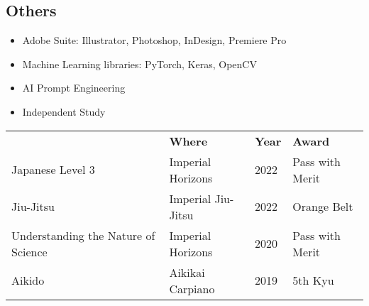 \documentclass{res}[12pt] %
\begin{document}
\begin{resume}
\subsection*{Others}
\begin{itemize}
    \large
    \item[\faPalette] Adobe Suite: Illustrator, Photoshop, InDesign, Premiere Pro
    \item[\faCode] Machine Learning libraries: PyTorch, Keras, OpenCV
    \item[\faBrain] AI Prompt Engineering
    \item[\faBook] Independent Study
\end{itemize}

\sectionRule
\vspace{6pt} %

{\large
\renewcommand{\arraystretch}{1.5}
\begin{tabularx}{\textwidth}{ p{200pt} X p{30pt} X }
     & \textbf{Where} & \textbf{Year} & \textbf{Award} \\
    Japanese Level 3 & Imperial Horizons & 2022 & Pass with Merit \\
    Jiu-Jitsu & Imperial Jiu-Jitsu & 2022 & Orange Belt \\
    Understanding the Nature of Science & Imperial Horizons & 2020 & Pass with Merit \\
    Aikido & Aikikai Carpiano & 2019 & 5th Kyu \\
\end{tabularx}
}

\begin{comment}
\newpage


\begin{minipage}{0.5\textwidth}
    \begin{tikzpicture}[x=1cm,y=0.8cm]
        \draw[thick,-stealth] (0,0) -- (0,20);
        \foreach \y/\year/\event/\description in {
            1/2016/Bachelor's Degree in Computer Science/{},
            3/2018/Internship at XYZ Company/{},
            5/2019/Master's Degree in Computer Science/{},
            7/2020/Research Assistant at University of ABC/{},
            9/2022/Software Developer at XYZ Company/{}
        } {
            \draw (0,\y) -- (-0.2,\y);
            \node[anchor=east, font=\small] at (-0.3,\y) {\year};
            \node[anchor=west, font=\small] at (0.3,\y) {\event};
            \node[anchor=west, text width=9cm, font=\footnotesize] at (1,\y) {\description};
        }
    \end{tikzpicture}
\end{minipage}
\hfill
\begin{minipage}{0.5\textwidth}
\end{minipage}


\end{comment}
\end{resume}
\end{document}
